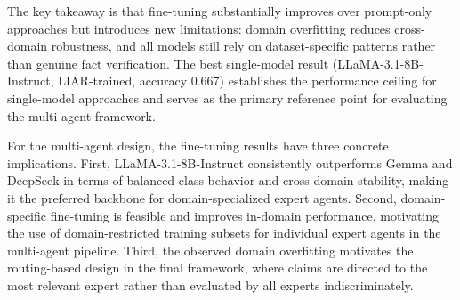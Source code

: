 The key takeaway is that fine-tuning substantially improves over prompt-only approaches but introduces new limitations: domain 
overfitting reduces cross-domain robustness, and all models still rely on dataset-specific patterns rather than genuine fact verification. The best single-model result (LLaMA-3.1-8B-Instruct, LIAR-trained, accuracy 0.667) establishes the performance ceiling for single-model approaches and serves as the primary reference point for evaluating the multi-agent framework.

For the multi-agent design, the fine-tuning results have three concrete implications. First, LLaMA-3.1-8B-Instruct consistently 
outperforms Gemma and DeepSeek in terms of balanced class behavior and cross-domain stability, making it the preferred backbone for 
domain-specialized expert agents. Second, domain-specific fine-tuning is feasible and improves in-domain performance, motivating the use of domain-restricted training subsets for individual expert agents in the multi-agent pipeline. Third, the observed domain overfitting motivates the routing-based design in the final framework, where claims are directed to the most relevant expert rather than evaluated by all experts indiscriminately.

